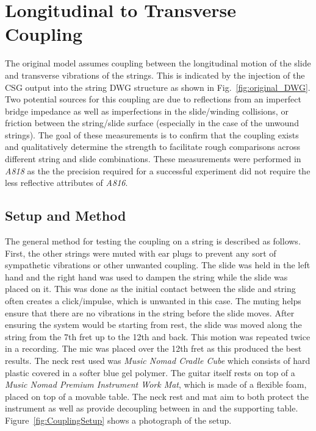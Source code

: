 \documentclass[../main.tex]{subfiles}
\begin{document}
\section{Longitudinal to Transverse Coupling}
The original model assumes coupling between the longitudinal motion of the slide and transverse vibrations of the strings. This is indicated by the injection of the CSG output into the string DWG structure as shown in Fig.~\ref{fig:original_DWG}. Two potential sources for this coupling are due to reflections from an imperfect bridge impedance as well as imperfections in the slide/winding collisions, or friction between the string/slide surface (especially in the case of the unwound strings). The goal of these measurements is to confirm that the coupling exists and qualitatively determine the strength to facilitate rough comparisons across different string and slide combinations. These measurements were performed in \emph{A818} as the the precision required for a successful experiment did not require the less reflective attributes of \emph{A816}.

\subsection{Setup and Method}
\label{sec:Ch5S&M}
The general method for testing the coupling on a string is described as follows. First, the other strings were muted with ear plugs to prevent any sort of sympathetic vibrations or other unwanted coupling. The slide was held in the left hand and the right hand was used to dampen the string while the slide was placed on it. This was done as the initial contact between the slide and string often creates a click/impulse, which is unwanted in this case. The muting helps ensure that there are no vibrations in the string before the slide moves. After ensuring the system would be starting from rest, the slide was moved along the string from the 7th fret up to the 12th and back. This motion was repeated twice in a recording. The mic was placed over the 12th fret as this produced the best results. The neck rest used was \emph{Music Nomad Cradle Cube} which consists of hard plastic covered in a softer blue gel polymer. The guitar itself rests on top of a \emph{Music Nomad Premium Instrument Work Mat}, which is made of a flexible foam, placed on top of a movable table. The neck rest and mat aim to both protect the instrument as well as provide decoupling between in and the supporting table. Figure~\ref{fig:CouplingSetup} shows a photograph of the setup.
\end{document}
